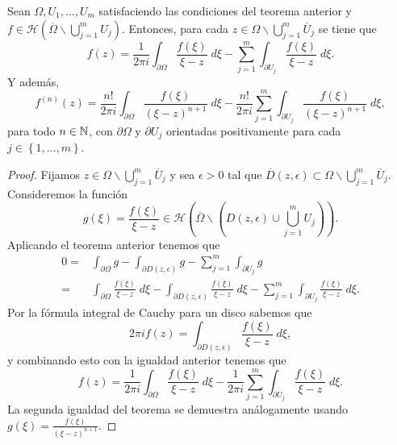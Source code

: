 \begin{theorem}
Sean $\displaystyle \Omega, U_{1}, \ldots, U_{m} $ satisfaciendo las condiciones del teorema anterior y $\displaystyle f \in \mathcal{H}\left(\overline{\Omega } \backslash \bigcup_{j = 1}^{m}U_{j}\right) $. Entonces, para cada $\displaystyle z \in \Omega \backslash \bigcup_{j = 1}^{m}\overline{U}_{j} $ se tiene que 
\[f\left(z\right)=\frac{1}{2\pi i}\int _{\partial \Omega }\frac{f\left(\xi\right)}{\xi - z} \; d\xi - \sum^{m}_{j = 1}\int _{\partial U_{j}}\frac{f\left(\xi\right)}{\xi - z} \; d\xi .\]
Y además, 
\[f^{\left(n\right)}\left(z\right)=\frac{n!}{2\pi i}\int _{\partial \Omega }\frac{f\left(\xi\right)}{\left(\xi - z\right)^{n+1}} \; d\xi - \frac{n!}{2\pi i}\sum^{m}_{j = 1}\int _{\partial U_{j}}\frac{f\left(\xi\right)}{\left(\xi-z\right)^{n+1}} \; d\xi ,\]
para todo $\displaystyle n \in \mathbb{N} $, con $\displaystyle \partial \Omega  $ y $\displaystyle \partial U_{j} $ orientadas positivamente para cada $\displaystyle j \in \left\{ 1, \ldots, m\right\}  $. 
\end{theorem}
\begin{proof}
Fijamos $\displaystyle z \in \Omega\backslash \bigcup_{j = 1}^{m}\overline{U}_{j} $ y sea $\displaystyle \epsilon > 0 $ tal que $\displaystyle \overline{D}\left(z,\epsilon \right)\subset \Omega \backslash \bigcup_{j = 1}^{m}\overline{U}_{j} $. Consideremos la función
\[g\left(\xi\right)=\frac{f\left(\xi\right)}{\xi-z}\in \mathcal{H}\left(\overline{\Omega }\backslash \left(D\left(z, \epsilon \right)\cup \bigcup_{j = 1}^{m}U_{j}\right)\right) .\]
Aplicando el teorema anterior tenemos que
\[
\begin{split}
	0 = & \int _{\partial \Omega }g -\int _{\partial D\left(z, \epsilon \right)}g -\sum^{m}_{j = 1}\int _{\partial U_{j}}g\\
	= & \int _{\partial \Omega }\frac{f\left(\xi\right)}{\xi-z} \; d\xi -\int _{\partial D\left(z, \epsilon \right)}\frac{f\left(\xi\right)}{\xi - z} \; d\xi - \sum^{m}_{j = 1}\int _{\partial U_{j}}\frac{f\left(\xi\right)}{\xi - z} \; d\xi.
\end{split}
\]
Por la fórmula integral de Cauchy para un disco sabemos que 
\[2\pi i f\left(z\right)=\int _{\partial D\left(z, \epsilon \right)}\frac{f\left(\xi\right)}{\xi-z} \; d\xi ,\]
y combinando esto con la igualdad anterior tenemos que 
\[f\left(z\right)=\frac{1}{2\pi i}\int _{\partial \Omega }\frac{f\left(\xi\right)}{\xi-z} \; d\xi -\frac{1}{2\pi i}\sum^{m}_{j = 1}\int _{\partial U_{j}}\frac{f\left(\xi\right)}{\xi-z} \; d\xi .\]
La segunda igualdad del teorema se demuestra análogamente usando $\displaystyle g\left(\xi\right)=\frac{f\left(\xi\right)}{\left(\xi-z\right)^{n+1}} $. 
\end{proof}

